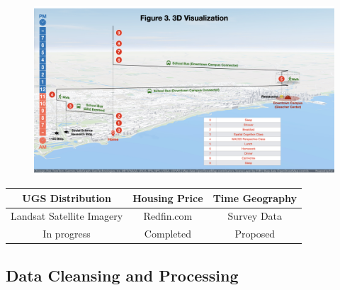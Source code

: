 \documentclass{beamer}
\begin{document}
\begin{frame}
\begin{figure}[h]
\begin{minipage}[t]{0.3\textwidth}
  \end{minipage}\hfill
  \begin{minipage}[t]{0.3\textwidth}
    \centering
    \includegraphics[width=\textwidth]{Visual/timegeo.jpeg}
  \end{minipage}
\end{figure}

\begin{table}
\centering
\begin{tabular}{|c|c|c|}
\hline
\textbf{UGS Distribution} & \textbf{Housing Price} & \textbf{Time Geography} \\
\hline
Landsat Satellite Imagery & Redfin.com & Survey Data \\
\hline
In progress & Completed & Proposed\\
\hline
\end{tabular}
\end{table}
\end{frame}

\subsection{Data Cleansing and Processing}
\end{document}

